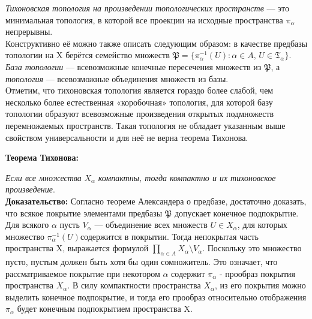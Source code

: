  \textit{Тихоновская топология на произведении топологических пространств} — это минимальная топология, в которой все проекции на исходные пространства $\pi_{\alpha}$  непрерывны.\\
 Конструктивно её можно также описать следующим образом: в качестве предбазы топологии на X берётся семейство множеств $ \mathfrak{P}=\{\pi_{\alpha}^{-1}(U): \alpha\in A,\, U\in \mathfrak{T}_{\alpha}\}.$  \textit{База топологии} — всевозможные конечные пересечения множеств из $\mathfrak{P}$, а \textit{топология} — всевозможные объединения множеств из базы.\\
 Отметим, что тихоновская топология является гораздо более слабой, чем несколько более естественная «коробочная» топология, для которой базу топологии образуют всевозможные произведения открытых подмножеств перемножаемых пространств. Такая топология не обладает указанным выше свойством универсальности и для неё не верна теорема Тихонова.
 \begin{center}
 \textbf{Теорема Тихонова:}
  \end{center} 
     \textit{Если все множества} $X_{\alpha}$    \textit{компактны, тогда компактно и их тихоновское произведение}.\\
   \textbf{Доказательство:} Согласно теореме Александера о предбазе, достаточно доказать, что всякое покрытие элементами предбазы $\mathfrak{P}$ допускает конечное подпокрытие. Для всякого $\alpha$ пусть $V_{\alpha}$ — объединение всех множеств $U\in X_{\alpha}$, для которых множество $\pi_{\alpha}^{-1}(U) $содержится в покрытии. Тогда непокрытая часть пространства X, выражается формулой
$\prod\limits_{\alpha\in A}X_{\alpha}\setminus V_{\alpha}$.
Поскольку это множество пусто, пустым должен быть хотя бы один сомножитель. Это означает, что рассматриваемое покрытие при некотором $\alpha$ содержит $\pi_{\alpha}$ - прообраз покрытия пространства $X_{\alpha}$. В силу компактности пространства $X_{\alpha}$, из его покрытия можно выделить конечное подпокрытие, и тогда его прообраз относительно отображения $\pi_{\alpha}$ будет конечным подпокрытием пространства X.
  